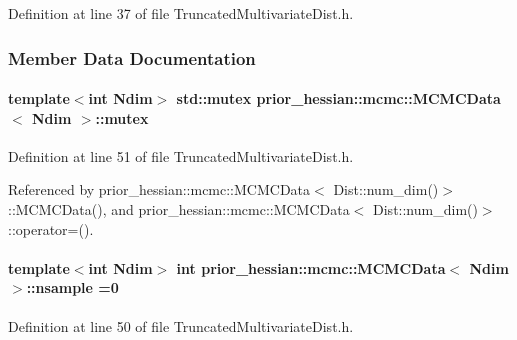 Definition at line 37 of file Truncated\+Multivariate\+Dist.\+h.



\subsubsection{Member Data Documentation}
\paragraph[{\texorpdfstring{mutex}{mutex}}]{\setlength{\rightskip}{0pt plus 5cm}template$<$int Ndim$>$ std\+::mutex {\bf prior\+\_\+hessian\+::mcmc\+::\+M\+C\+M\+C\+Data}$<$ Ndim $>$\+::mutex\hspace{0.3cm}{\ttfamily [mutable]}}\hypertarget{classprior__hessian_1_1mcmc_1_1MCMCData_a3a3367abe6e642f25b12abb66f3b2dc6}{}\label{classprior__hessian_1_1mcmc_1_1MCMCData_a3a3367abe6e642f25b12abb66f3b2dc6}


Definition at line 51 of file Truncated\+Multivariate\+Dist.\+h.



Referenced by prior\+\_\+hessian\+::mcmc\+::\+M\+C\+M\+C\+Data$<$ Dist\+::num\+\_\+dim()$>$\+::\+M\+C\+M\+C\+Data(), and prior\+\_\+hessian\+::mcmc\+::\+M\+C\+M\+C\+Data$<$ Dist\+::num\+\_\+dim()$>$\+::operator=().

\paragraph[{\texorpdfstring{nsample}{nsample}}]{\setlength{\rightskip}{0pt plus 5cm}template$<$int Ndim$>$ int {\bf prior\+\_\+hessian\+::mcmc\+::\+M\+C\+M\+C\+Data}$<$ Ndim $>$\+::nsample =0}\hypertarget{classprior__hessian_1_1mcmc_1_1MCMCData_ad6cd36c82044f291c2d6f061acc960dd}{}\label{classprior__hessian_1_1mcmc_1_1MCMCData_ad6cd36c82044f291c2d6f061acc960dd}


Definition at line 50 of file Truncated\+Multivariate\+Dist.\+h.



